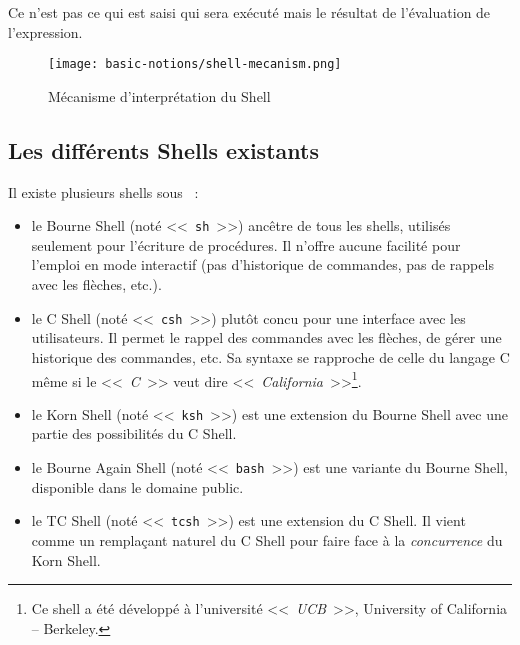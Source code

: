 \begin{center}
	{
		\parbox[c]{0.8\textwidth}{\Large Ce n'est pas ce qui est saisi qui sera ex{\'e}cut{\'e} 
		mais le r{\'e}sultat de l'{\'e}valuation de l'expression.
		} 
	}
\end{center}

\begin{figure}[hbtp]
\centering
\texttt{[image: basic-notions/shell-mecanism.png]}
\caption{\label{fig-basnot-exec-cmd}M{\'e}canisme d'interpr{\'e}tation du Shell}
\end{figure}


\subsection{Les diff{\'e}rents Shells existants}
Il existe plusieurs shells sous {\Unix}~:
\begin{itemize}
	\item	le Bourne Shell (not{\'e} <<~\texttt{sh}~>>) anc{\^e}tre de tous les shells,
			utilis{\'e}s seulement pour l'{\'e}criture de proc{\'e}dures. Il n'offre aucune
			facilit{\'e} pour l'emploi en mode interactif (pas d'historique de
			commandes, pas de rappels avec les fl{\`e}ches, etc.).
	\item	le C Shell (not{\'e} <<~\texttt{csh}~>>) plut{\^o}t concu pour une interface avec
			les utilisateurs. Il permet le rappel des commandes avec les fl{\`e}ches,
			de g{\'e}rer une historique des commandes, etc. Sa syntaxe
			se rapproche de celle du langage C m{\^e}me si le <<~\textsl{C}~>>
			veut dire <<~\textsl{California}~>>\footnote{Ce shell a {\'e}t{\'e} d{\'e}velopp{\'e} {\`a}
			l'universit{\'e} <<~\textsl{UCB}~>>, University of California -- Berkeley.}.
	\item	le Korn Shell (not{\'e} <<~\texttt{ksh}~>>) est une extension du Bourne Shell
			avec une partie des possibilit{\'e}s du C Shell.
	\item	le Bourne Again Shell (not{\'e} <<~\texttt{bash}~>>) est une variante du Bourne Shell,
			disponible dans le domaine public.
	\item	le TC Shell (not{\'e} <<~\texttt{tcsh}~>>) est une extension du C Shell. Il
			vient comme un rempla\c{c}ant naturel du C Shell pour faire face {\`a} la
			{\it concurrence} du Korn Shell.
\end{itemize}

